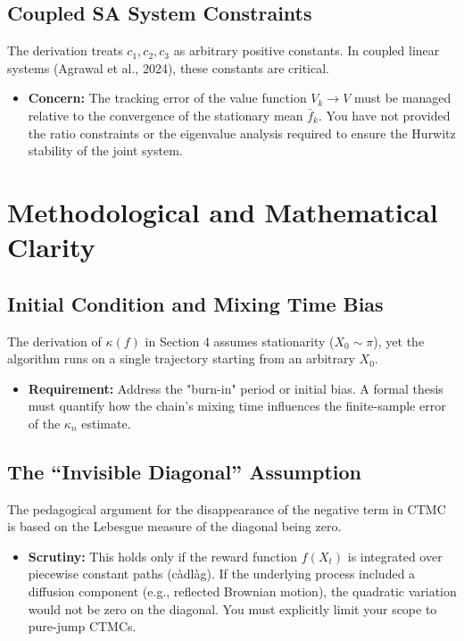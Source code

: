 \documentclass[11pt]{article}
\begin{document}
\subsection{Coupled SA System Constraints}
The derivation treats $c_1, c_2, c_3$ as arbitrary positive constants. In coupled linear systems (Agrawal et al., 2024), these constants are critical.
\begin{itemize}
    \item \textbf{Concern:} The tracking error of the value function $V_k \to V$ must be managed relative to the convergence of the stationary mean $\bar{f}_k$. You have not provided the ratio constraints or the eigenvalue analysis required to ensure the Hurwitz stability of the joint system.
\end{itemize}

\section{Methodological and Mathematical Clarity}

\subsection{Initial Condition and Mixing Time Bias}
The derivation of $\kappa(f)$ in Section 4 assumes stationarity ($X_0 \sim \pi$), yet the algorithm runs on a single trajectory starting from an arbitrary $X_0$.
\begin{itemize}
    \item \textbf{Requirement:} Address the "burn-in" period or initial bias. A formal thesis must quantify how the chain's mixing time influences the finite-sample error of the $\kappa_n$ estimate.
\end{itemize}

\subsection{The ``Invisible Diagonal'' Assumption}
The pedagogical argument for the disappearance of the negative term in CTMC is based on the Lebesgue measure of the diagonal being zero.
\begin{itemize}
    \item \textbf{Scrutiny:} This holds only if the reward function $f(X_t)$ is integrated over piecewise constant paths (c\`adl\`ag). If the underlying process included a diffusion component (e.g., reflected Brownian motion), the quadratic variation would not be zero on the diagonal. You must explicitly limit your scope to pure-jump CTMCs.
\end{itemize}
\end{document}
